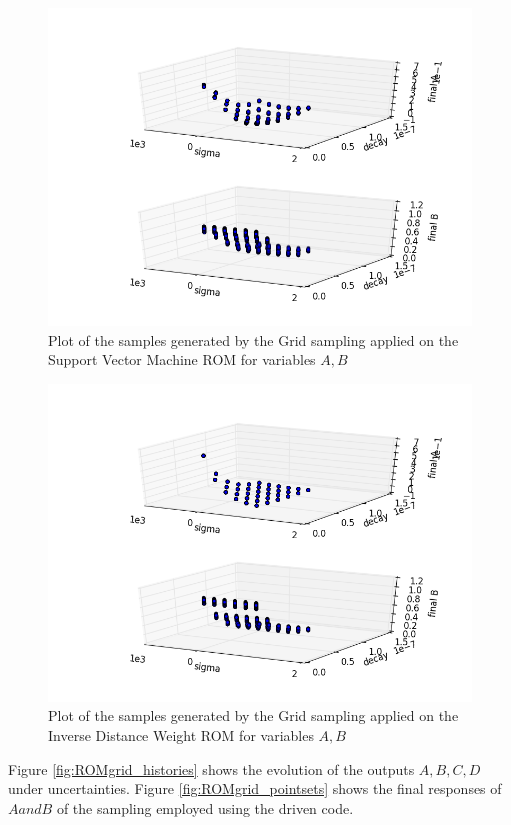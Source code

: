 \begin{figure}[h!]
  \centering
  \includegraphics[scale=0.7]{pics/samplesPlot3DROMsvm_scatter-scatter.png}
  \caption{Plot of the samples generated by the Grid sampling applied on the Support Vector Machine ROM for variables $A,B$}
  \label{fig:ROMsvm_samples}
 \end{figure}
 \begin{figure}[h!]
  \centering
  \includegraphics[scale=0.7]{pics/samplesPlot3DROMinverse_scatter-scatter.png}
  \caption{Plot of the samples generated by the Grid sampling applied on the Inverse Distance Weight ROM for variables $A,B$}
  \label{fig:ROMinverse_samples}
 \end{figure}
 Figure \ref{fig:ROMgrid_histories}
 shows the evolution of the outputs $A,B,C,D$ under uncertainties.
 Figure \ref{fig:ROMgrid_pointsets} shows the final responses  of $A and B$
 of the sampling employed using the driven code.

